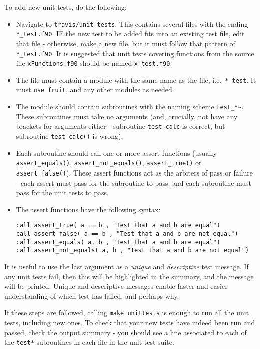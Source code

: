 To add new unit tests, do the following:

\begin{itemize}
\item Navigate to \texttt{travis/unit\_tests}. This contains several
  files with the ending \texttt{*\_test.f90}. IF the new test to be
  added fits into an existing test file, edit that file - otherwise,
  make a new file, but it must follow that pattern of
  \texttt{*\_test.f90}. It is suggested that unit tests covering
  functions from the source file \texttt{xFunctions.f90} should be
  named \texttt{x\_test.f90}.
\item The file must contain a module with the same name as the file,
  i.e.~\texttt{*\_test}. It must \texttt{use\ fruit}, and any other
  modules as needed.
\item The module should contain subroutines with the naming scheme
  \texttt{test\_*\textasciitilde{}}. These subroutines must take no
  arguments (and, crucially, not have any brackets for arguments
  either - subroutine \texttt{test\_calc} is correct, but subroutine
  \texttt{test\_calc()} is wrong).
\item Each subroutine should call one or more assert functions
  (usually \texttt{assert\_equals()}, \texttt{assert\_not\_equals()},
  \texttt{assert\_true()} or \texttt{assert\_false()}).  These assert
  functions act as the arbiters of pass or failure - each assert must
  pass for the subroutine to pass, and each subroutine must pass for
  the unit tests to pass.
\item The assert functions have the following syntax:

\begin{verbatim}
call assert_true( a == b , "Test that a and b are equal")
call assert_false( a == b , "Test that a and b are not equal")
call assert_equals( a, b , "Test that a and b are equal")
call assert_not_equals( a, b , "Test that a and b are not equal")
\end{verbatim}

\end{itemize}

It is useful to use the last argument as a \emph{unique} and
\emph{descriptive} test message. If any unit tests fail, then this
will be highlighted in the summary, and the message will be
printed. Unique and descriptive messages enable faster and easier
understanding of which test has failed, and perhaps why.

If these steps are followed, calling \texttt{make\ unittests} is
enough to run all the unit tests, including new ones. To check that
your new tests have indeed been run and passed, check the output
summary - you should see a line associated to each of the
\texttt{test*} subroutines in each file in the unit test suite.

